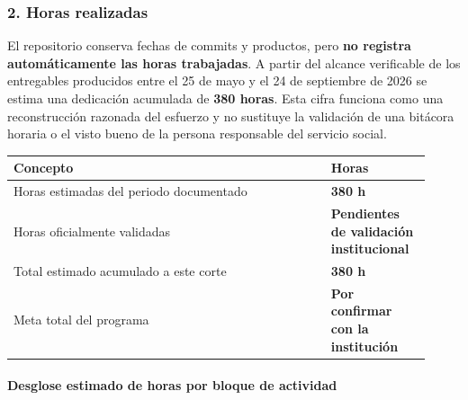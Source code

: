 \documentclass[
  spanish,
]{article}
\newcounter{none} %
\begin{document}
\subsubsection{2. Horas realizadas}\label{2-horas-realizadas}

El repositorio conserva fechas de commits y productos, pero \textbf{no
registra automáticamente las horas trabajadas}. A partir del alcance
verificable de los entregables producidos entre el 25 de mayo y el 24
de septiembre de 2026 se estima una dedicación acumulada de
\textbf{380 horas}. Esta cifra funciona como una reconstrucción razonada
del esfuerzo y no sustituye la validación de una bitácora horaria o el
visto bueno de la persona responsable del servicio social.

{\def\LTcaptype{none} %
\begin{longtable}[]{@{}p{0.70\linewidth}p{0.22\linewidth}@{}}
\toprule\noalign{}
Concepto & Horas \\
\midrule\noalign{}
\endhead
\bottomrule\noalign{}
\endlastfoot
Horas estimadas del periodo documentado & \textbf{380 h} \\
Horas oficialmente validadas & \textbf{Pendientes de validación
institucional} \\
Total estimado acumulado a este corte & \textbf{380 h} \\
Meta total del programa & \textbf{Por confirmar con la institución} \\
\end{longtable}
}

\paragraph{Desglose estimado de horas por bloque de
actividad}\label{desglose-estimado-de-horas-por-bloque-de-actividad}
\end{document}
